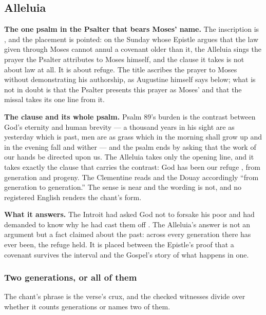 \elementguard
\subsection*{Alleluia }


\textbf{The one psalm in the Psalter that bears Moses' name.} The inscription
is , and the placement is pointed: on the
Sunday whose Epistle argues that the
law given through Moses cannot annul a covenant older than it, the Alleluia
sings the prayer the Psalter attributes to Moses himself, and the clause it
takes is not about law at all. It is about refuge. The title ascribes the
prayer to Moses without demonstrating his authorship, as Augustine himself
says below; what is not in doubt is that the Psalter presents this prayer as
Moses' and that the missal takes its one line from it.

\textbf{The clause and its whole psalm.} Psalm 89's burden is the contrast
between God's eternity and human brevity --- a thousand years in his sight are
as yesterday which is past, men are as grass which in the morning shall grow up
and in the evening fall and wither --- and the psalm ends by asking that the
work of our hands be directed upon us. The Alleluia takes only the opening
line, and it takes exactly the clause that carries the contrast: God has been
our refuge , from generation and progeny. The
Clementine reads  and the Douay
accordingly ``from generation to generation.'' The sense is near and the
wording is not, and no registered English renders the chant's form.

\textbf{What it answers.} The Introit had asked God not to forsake his poor
 and had demanded to know why he had cast them off
. The Alleluia's answer is not an argument but a fact claimed
about the past: across every generation there has ever been, the refuge held.
It is placed between the Epistle's proof that a covenant survives the interval
and the Gospel's story of what happens in one.

\subsubsection*{Two generations, or all of them}

The chant's phrase is the verse's crux, and the checked witnesses divide over
whether it counts generations or names two of them.

